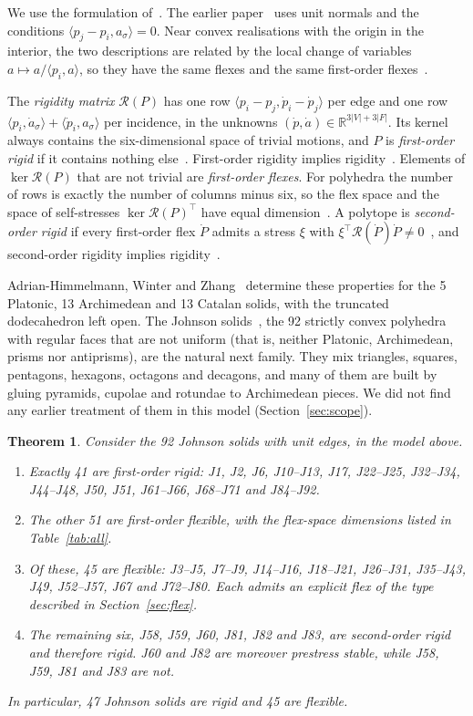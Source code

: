 \documentclass[11pt]{amsart}
\newtheorem{theorem}{Theorem}[section]
\theoremstyle{remark}
\newcommand{\R}{\mathbb R}
\newcommand{\RR}{\mathcal R}
\begin{document}
We use the formulation of~\cite{AHWZ2026}. The earlier paper~\cite{HSW2026} uses unit normals and the conditions $\langle p_j-p_i,a_\sigma\rangle=0$. Near convex realisations with the origin in the interior, the two descriptions are related by the local change of variables $a\mapsto a/\langle p_i,a\rangle$, so they have the same flexes and the same first-order flexes~\cite{AHWZ2026}.

The \emph{rigidity matrix} $\RR(P)$ has one row $\langle p_i-p_j,\dot p_i-\dot p_j\rangle$ per edge and one row $\langle p_i,\dot a_\sigma\rangle+\langle\dot p_i,a_\sigma\rangle$ per incidence, in the unknowns $(\dot p,\dot a)\in\R^{3|V|+3|F|}$. Its kernel always contains the six-dimensional space of trivial motions, and $P$ is \emph{first-order rigid} if it contains nothing else~\cite[Cor.~3.2]{AHWZ2026}. First-order rigidity implies rigidity~\cite[Thm.~3.3]{AHWZ2026}. Elements of $\ker\RR(P)$ that are not trivial are \emph{first-order flexes}. For polyhedra the number of rows is exactly the number of columns minus six, so the flex space and the space of self-stresses $\ker\RR(P)^\top$ have equal dimension~\cite[Prop.~3.6]{AHWZ2026}. A polytope is \emph{second-order rigid} if every first-order flex $\dot P$ admits a stress $\xi$ with $\xi^\top\RR(\dot P)\dot P\neq0$~\cite[Thm.~4.2]{AHWZ2026}, and second-order rigidity implies rigidity~\cite[Thm.~4.1]{AHWZ2026}.

Adrian-Himmelmann, Winter and Zhang~\cite{AHWZ2026} determine these properties for the 5 Platonic, 13 Archimedean and 13 Catalan solids, with the truncated dodecahedron left open. The Johnson solids~\cite{Johnson1966,Zalgaller1969}, the 92 strictly convex polyhedra with regular faces that are not uniform (that is, neither Platonic, Archimedean, prisms nor antiprisms), are the natural next family. They mix triangles, squares, pentagons, hexagons, octagons and decagons, and many of them are built by gluing pyramids, cupolae and rotundae to Archimedean pieces. We did not find any earlier treatment of them in this model (Section~\ref{sec:scope}).

\begin{theorem}\label{thm:main}
Consider the 92 Johnson solids with unit edges, in the model above.
\begin{enumerate}
\item Exactly 41 are first-order rigid: J1, J2, J6, J10--J13, J17, J22--J25, J32--J34, J44--J48, J50, J51, J61--J66, J68--J71 and J84--J92.
\item The other 51 are first-order flexible, with the flex-space dimensions listed in Table~\ref{tab:all}.
\item Of these, 45 are flexible: J3--J5, J7--J9, J14--J16, J18--J21, J26--J31, J35--J43, J49, J52--J57, J67 and J72--J80. Each admits an explicit flex of the type described in Section~\ref{sec:flex}.
\item The remaining six, J58, J59, J60, J81, J82 and J83, are second-order rigid and therefore rigid. J60 and J82 are moreover prestress stable, while J58, J59, J81 and J83 are not.
\end{enumerate}
In particular, 47 Johnson solids are rigid and 45 are flexible.
\end{theorem}
\end{document}

